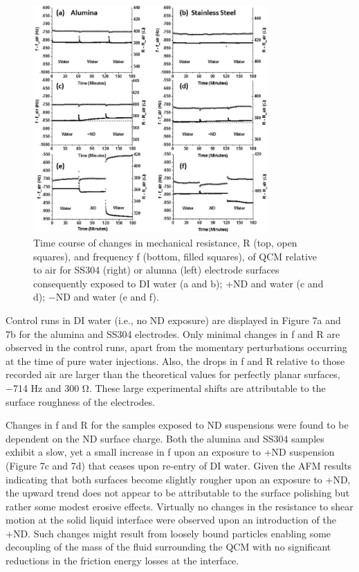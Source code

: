 \begin{figure}[hbtp]
	\centering
	\includegraphics[width=0.8\textwidth]{Chapter-4/fig7_png}
	\caption{Time course of changes in mechanical resistance, R (top, open squares), and frequency f (bottom, filled squares), of QCM relative to air for SS304 (right) or alumna (left) electrode surfaces consequently exposed to DI water (a and b); +ND and water (c and d); −ND and water (e and f).}
	\label{fig7:AFM images}
\end{figure} 

Control runs in DI water (i.e., no ND exposure) are displayed in Figure 7a and 7b for the alumina and SS304 electrodes. Only minimal changes in f and R are observed in the control runs, apart from the momentary perturbations occurring at the time of pure water injections. Also, the drops in f and R relative to those recorded air are larger than the theoretical values for perfectly planar surfaces, −714 Hz and 300 Ω. These large experimental shifts are attributable to the surface roughness of the electrodes.

Changes in f and R for the samples exposed to ND suspensions were found to be dependent on the ND surface charge. Both the alumina and SS304 samples exhibit a slow, yet a small increase in f upon an exposure to +ND suspension (Figure 7c and 7d) that ceases upon re-entry of DI water. Given the AFM results indicating that both surfaces become slightly rougher upon an exposure to +ND, the upward trend does not appear to be attributable to the surface polishing but rather some modest erosive effects. Virtually no changes in the resistance to shear motion at the solid liquid interface were observed upon an introduction of the +ND. Such changes might result from loosely bound particles enabling some decoupling of the mass of the fluid surrounding the QCM with no significant reductions in the friction energy losses at the interface.

